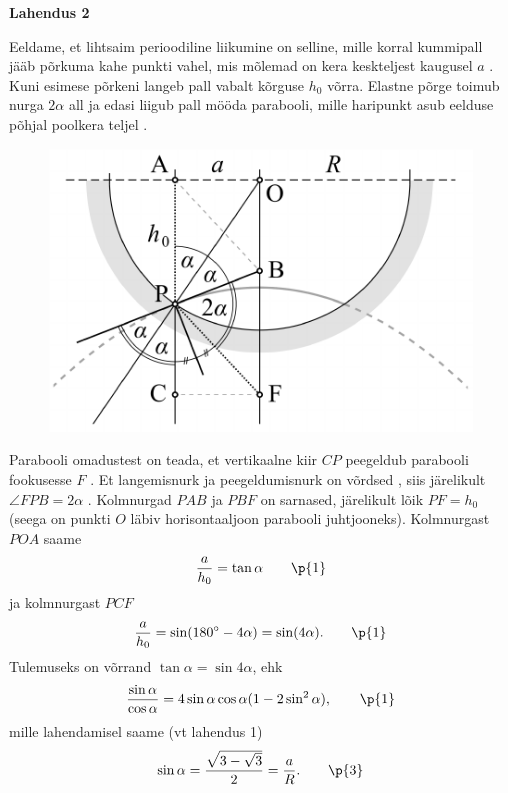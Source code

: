 \textbf{Lahendus 2}

Eeldame, et lihtsaim perioodiline liikumine on selline, mille korral kummipall jääb põrkuma kahe punkti vahel, mis mõlemad on kera keskteljest kaugusel $a$ . Kuni esimese põrkeni langeb pall vabalt kõrguse $h_0$ võrra. Elastne põrge toimub nurga $2\alpha$ all  ja edasi liigub pall mööda parabooli, mille haripunkt asub eelduse põhjal poolkera teljel .

\begin{figure}
\vspace{-1.1cm}
  \begin{center}
    \includegraphics[width=1\linewidth]{2024-v2g-10-sol2.pdf}
  \end{center}
  \vspace{-0.5cm}
\end{figure}

Parabooli omadustest on teada, et vertikaalne kiir $CP$ peegeldub parabooli fookusesse $F$ . Et langemisnurk ja peegeldumisnurk on võrdsed , siis järelikult $\angle{FPB}=2\alpha$ . Kolmnurgad $PAB$ ja $PBF$ on sarnased, järelikult lõik $PF=h_0$  (seega on punkti $O$ läbiv horisontaaljoon parabooli juhtjooneks). Kolmnurgast $POA$ saame
\[\frac{a}{h_0}=\tan\alpha\qquad \p{1}\]
ja kolmnurgast $PCF$
\[\frac{a}{h_0}=\sin(180^\circ-4\alpha)=\sin(4\alpha). \qquad \p{1}\]
Tulemuseks on võrrand $\tan\alpha=\sin 4\alpha$, ehk
\[\frac{\sin\alpha}{\cos\alpha}=4\sin\alpha\cos\alpha(1-2\sin^2\alpha), \qquad \p{1}\]
mille lahendamisel saame (vt lahendus 1)
\[\sin\alpha=\frac{\sqrt{3-\sqrt{3}}}{2}=\frac{a}{R}. \qquad \p{3}\]
\probend
